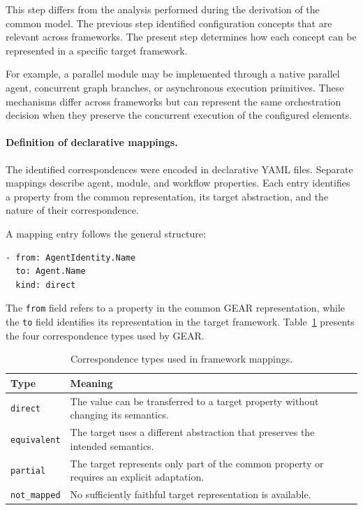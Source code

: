 This step differs from the analysis performed during the derivation of the
common model. The previous step identified configuration concepts that are
relevant across frameworks. The present step determines how each concept can be
represented in a specific target framework.

For example, a parallel module may be implemented through a native parallel
agent, concurrent graph branches, or asynchronous execution primitives. These
mechanisms differ across frameworks but can represent the same orchestration
decision when they preserve the concurrent execution of the configured
elements.


\paragraph{\textbf{Definition of declarative mappings.}}
The identified correspondences were encoded in declarative YAML files. Separate
mappings describe agent, module, and workflow properties. Each entry identifies
a property from the common representation, its target abstraction, and the
nature of their correspondence.

A mapping entry follows the general structure:

\begin{verbatim}
- from: AgentIdentity.Name
  to: Agent.Name
  kind: direct
\end{verbatim}

The \texttt{from} field refers to a property in the common GEAR representation,
while the \texttt{to} field identifies its representation in the target
framework. Table~\ref{tab:mapping-types} presents the four correspondence types
used by GEAR.

\begin{table}[t]
    \centering
    \caption{Correspondence types used in framework mappings.}
    \label{tab:mapping-types}
    \footnotesize
    \begin{tabularx}{\columnwidth}{
        @{}
        p{}
        >{\raggedright\arraybackslash}X
        @{}
    }
        \toprule
        \textbf{Type}
        & \textbf{Meaning} \\
        \midrule

        \texttt{direct}
        & The value can be transferred to a target property without changing
        its semantics. \\

        \texttt{equivalent}
        & The target uses a different abstraction that preserves the intended
        semantics. \\

        \texttt{partial}
        & The target represents only part of the common property or requires
        an explicit adaptation. \\

        \texttt{not\_mapped}
        & No sufficiently faithful target representation is available. \\

        \bottomrule
    \end{tabularx}
\end{table}

